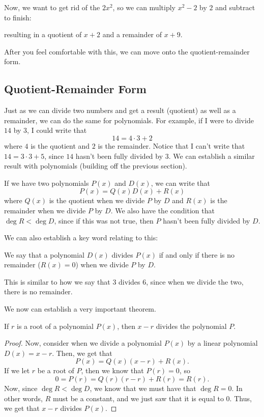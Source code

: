 \documentclass[11pt]{scrartcl}
\begin{document}
Now, we want to get rid of the $2x^2$, so we can multiply $x^2-2$ by $2$ and subtract to finish:

\begin{center}
\end{center}

resulting in a quotient of $x+2$ and a remainder of $x+9$.

After you feel comfortable with this, we can move onto the quotient-remainder form.

\subsection{Quotient-Remainder Form}

Just as we can divide two numbers and get a result (quotient) as well as a remainder, we can do the same for polynomials. For example, if I were to divide $14$ by $3$, I could write that \[14 = 4\cdot 3+2\] where $4$ is the quotient and $2$ is the remainder. Notice that I can't write that $14 = 3\cdot 3 + 5$, since $14$ hasn't been fully divided by $3$. We can establish a similar result with polynomials (building off the previous section).

\begin{lemma*}
If we have two polynomials $P(x)$ and $D(x)$, we can write that \[P(x) = Q(x)D(x)+R(x)\] where $Q(x)$ is the quotient when we divide $P$ by $D$ and $R(x)$ is the remainder when we divide $P$ by $D$. We also have the condition that $\deg R < \deg D$, since if this was not true, then $P$ hasn't been fully divided by $D$.
\end{lemma*}

We can also establish a key word relating to this:

\begin{definition*}[Divides]
We say that a polynomial $D(x)$ divides $P(x)$ if and only if there is no remainder ($R(x) = 0$) when we divide $P$ by $D$.
\end{definition*}

This is similar to how we say that $3$ divides $6$, since when we divide the two, there is no remainder.

We now can establish a very important theorem.

\begin{theorem*}
If $r$ is a root of a polynomial $P(x)$, then $x-r$ divides the polynomial $P$.
\end{theorem*}
\begin{proof}
Now, consider when we divide a polynomial $P(x)$ by a linear polynomial $D(x) = x-r$. Then, we get that \[P(x) = Q(x)(x-r)+R(x).\] If we let $r$ be a root of $P$, then we know that $P(r) = 0$, so \[0 = P(r) = Q(r)(r-r)+R(r) = R(r).\] Now, since $\deg R < \deg D$, we know that we must have that $\deg R = 0$. In other words, $R$ must be a constant, and we just saw that it is equal to $0$. Thus, we get that $x-r$ divides $P(x)$.
\end{proof}
\end{document}
